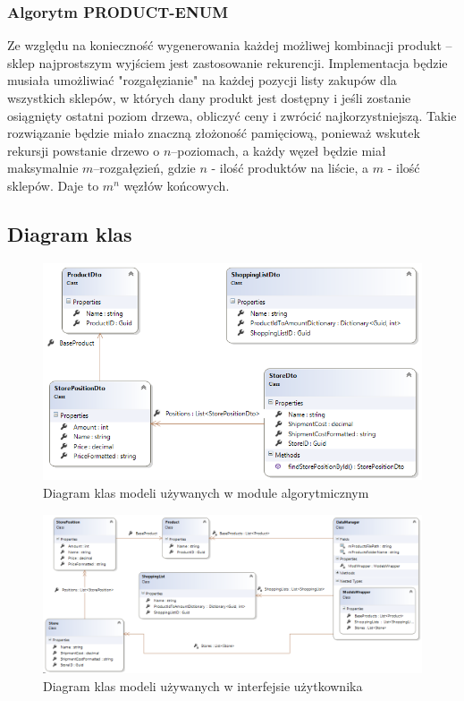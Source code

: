 \documentclass[a4paper]{article}
\begin{document}
\subsubsection{Algorytm PRODUCT-ENUM}
Ze względu na konieczność wygenerowania każdej możliwej kombinacji produkt – sklep najprostszym wyjściem jest zastosowanie rekurencji. Implementacja będzie musiała umożliwiać "rozgałęzianie" na każdej pozycji listy zakupów dla wszystkich sklepów, w których dany produkt jest dostępny i jeśli zostanie osiągnięty ostatni poziom drzewa, obliczyć ceny i zwrócić najkorzystniejszą. Takie rozwiązanie będzie miało znaczną złożoność pamięciową, ponieważ wskutek rekursji powstanie drzewo o $n$–poziomach, a każdy węzeł będzie miał maksymalnie $m$–rozgałęzień, gdzie $n$ - ilość produktów na liście, a $m$ - ilość sklepów. Daje to $m^n$ węzłów końcowych.
\subsection{Diagram klas}
\begin{figure}[H]
\centering
\includegraphics[width=\textwidth,keepaspectratio]{img/diagram-dto.png}
\caption{Diagram klas modeli używanych w module algorytmicznym}
\end{figure}
\begin{figure}[H]
\centering
\includegraphics[width=\textwidth,keepaspectratio]{img/diagram-gui.png}
\caption{Diagram klas modeli używanych w interfejsie użytkownika}
\end{figure}
\end{document}
